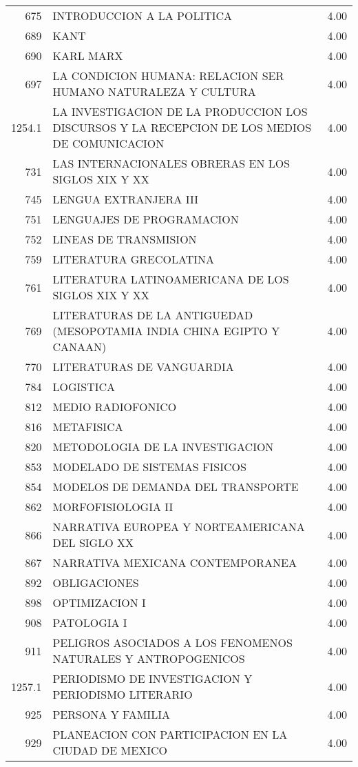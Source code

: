 \documentclass[12pt]{article}
\begin{document}
\begin{table}[ht]
{\begin{tabular}{rlr}
  675 & INTRODUCCION A LA POLITICA & 4.00 \\ 
  689 & KANT & 4.00 \\ 
  690 & KARL MARX & 4.00 \\ 
  697 & LA CONDICION HUMANA: RELACION SER HUMANO NATURALEZA Y CULTURA & 4.00 \\ 
  1254.1 & LA INVESTIGACION DE LA PRODUCCION LOS DISCURSOS Y LA RECEPCION DE LOS MEDIOS DE COMUNICACION & 4.00 \\ 
  731 & LAS INTERNACIONALES OBRERAS EN LOS SIGLOS XIX Y XX & 4.00 \\ 
  745 & LENGUA EXTRANJERA III & 4.00 \\ 
  751 & LENGUAJES DE PROGRAMACION & 4.00 \\ 
  752 & LINEAS DE TRANSMISION & 4.00 \\ 
  759 & LITERATURA GRECOLATINA & 4.00 \\ 
  761 & LITERATURA LATINOAMERICANA DE LOS SIGLOS XIX Y XX & 4.00 \\ 
  769 & LITERATURAS DE LA ANTIGUEDAD (MESOPOTAMIA INDIA CHINA EGIPTO Y CANAAN) & 4.00 \\ 
  770 & LITERATURAS DE VANGUARDIA & 4.00 \\ 
  784 & LOGISTICA & 4.00 \\ 
  812 & MEDIO RADIOFONICO & 4.00 \\ 
  816 & METAFISICA & 4.00 \\ 
  820 & METODOLOGIA DE LA INVESTIGACION & 4.00 \\ 
  853 & MODELADO DE SISTEMAS FISICOS & 4.00 \\ 
  854 & MODELOS DE DEMANDA DEL TRANSPORTE & 4.00 \\ 
  862 & MORFOFISIOLOGIA II & 4.00 \\ 
  866 & NARRATIVA EUROPEA Y NORTEAMERICANA DEL SIGLO XX & 4.00 \\ 
  867 & NARRATIVA MEXICANA CONTEMPORANEA & 4.00 \\ 
  892 & OBLIGACIONES & 4.00 \\ 
  898 & OPTIMIZACION I & 4.00 \\ 
  908 & PATOLOGIA I & 4.00 \\ 
  911 & PELIGROS ASOCIADOS A LOS FENOMENOS NATURALES Y ANTROPOGENICOS & 4.00 \\ 
  1257.1 & PERIODISMO DE INVESTIGACION Y PERIODISMO LITERARIO & 4.00 \\ 
  925 & PERSONA Y FAMILIA & 4.00 \\ 
  929 & PLANEACION CON PARTICIPACION EN LA CIUDAD DE MEXICO & 4.00 \\ 

\end{tabular}}
\end{table}
\end{document}
